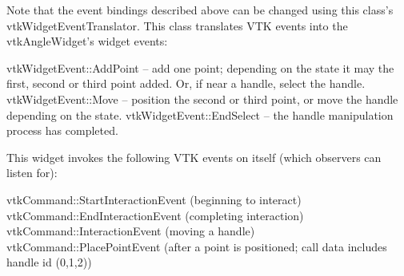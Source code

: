 Note that the event bindings described above can be changed using this class's vtk\-Widget\-Event\-Translator. This class translates V\-T\-K events into the vtk\-Angle\-Widget's widget events\-: 
\begin{DoxyPre}
   vtkWidgetEvent::AddPoint -- add one point; depending on the state
                               it may the first, second or third point 
                               added. Or, if near a handle, select the handle.
   vtkWidgetEvent::Move -- position the second or third point, or move the
                           handle depending on the state.
   vtkWidgetEvent::EndSelect -- the handle manipulation process has completed.
 \end{DoxyPre}


This widget invokes the following V\-T\-K events on itself (which observers can listen for)\-: 
\begin{DoxyPre}
   vtkCommand::StartInteractionEvent (beginning to interact)
   vtkCommand::EndInteractionEvent (completing interaction)
   vtkCommand::InteractionEvent (moving a handle)
   vtkCommand::PlacePointEvent (after a point is positioned; 
                                call data includes handle id (0,1,2))
 \end{DoxyPre}


